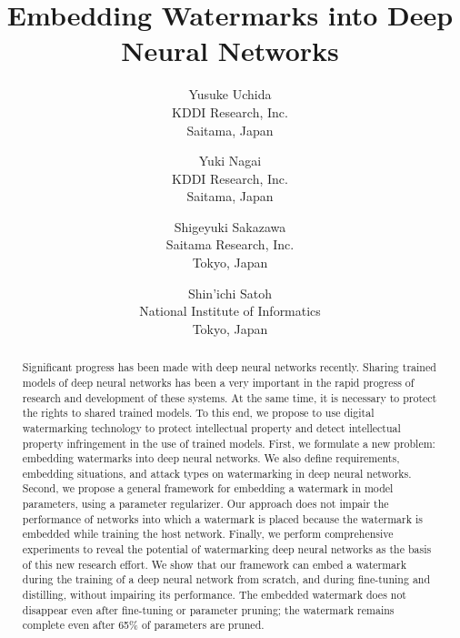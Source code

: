\documentclass[10pt,twocolumn,letterpaper]{article}
\begin{document}
\title{Embedding Watermarks into Deep Neural Networks}

\author{Yusuke Uchida \\
KDDI Research, Inc. \\
Saitama, Japan \\
\and
Yuki Nagai \\
KDDI Research, Inc. \\
Saitama, Japan \\
\and
Shigeyuki Sakazawa \\
Saitama Research, Inc. \\
Tokyo, Japan \\
\and
Shin'ichi Satoh \\
National Institute of Informatics \\
Tokyo, Japan
}



\maketitle

\begin{abstract}
Significant progress has been made with deep neural networks recently.
Sharing trained models of deep neural networks has been a very important in the rapid progress of research and development of these systems.
At the same time, it is necessary to protect the rights to shared trained models.
To this end, we propose to use digital watermarking technology to protect intellectual property and detect intellectual property infringement in the use of trained models.
First, we formulate a new problem: embedding watermarks into deep neural networks.
We also define requirements, embedding situations, and attack types on watermarking in deep neural networks.
Second, we propose a general framework for embedding a watermark in model parameters, using a parameter regularizer.
Our approach does not impair the performance of networks into which a watermark is placed because the watermark is embedded while training the host network.
Finally, we perform comprehensive experiments to reveal the potential of watermarking deep neural networks as the basis of this new research effort.
We show that our framework can embed a watermark during the training of a deep neural network from scratch, and during fine-tuning and distilling, without impairing its performance.
The embedded watermark does not disappear even after fine-tuning or parameter pruning; the watermark remains complete even after 65\% of parameters are pruned.
\end{abstract}
\end{document}
